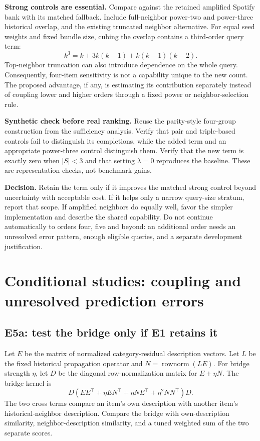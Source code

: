 \documentclass[11pt,a4paper]{article}
\newcommand{\rownorm}{\operatorname{rownorm}}
\begin{document}
\textbf{Strong controls are essential.} Compare against the retained
amplified Spotify bank with its matched fallback. Include full-neighbor
power-two and power-three historical overlap, and the existing truncated
neighbor alternative. For equal seed weights and fixed bundle size, cubing
the overlap contains a third-order query term:
\begin{equation}
 k^3=k+3k(k-1)+k(k-1)(k-2).
\end{equation}
Top-neighbor truncation can also introduce dependence on the whole query.
Consequently, four-item sensitivity is not a capability unique to the new
count. The proposed advantage, if any, is estimating its contribution
separately instead of coupling lower and higher orders through a fixed power
or neighbor-selection rule.

\textbf{Synthetic check before real ranking.} Reuse the parity-style
four-group construction from the sufficiency analysis. Verify that pair and
triple-based controls fail to distinguish its completions, while the added
term and an appropriate power-three control distinguish them. Verify that
the new term is exactly zero when $|S|<3$ and that setting $\lambda=0$
reproduces the baseline. These are representation checks, not benchmark gains.

\textbf{Decision.} Retain the term only if it improves the matched strong
control beyond uncertainty with acceptable cost. If it helps only a narrow
query-size stratum, report that scope. If amplified neighbors do equally
well, favor the simpler implementation and describe the shared capability.
Do not continue automatically to orders four, five and beyond: an additional
order needs an unresolved error pattern, enough eligible queries, and a
separate development justification.

\section{Conditional studies: coupling and unresolved prediction errors}
\label{sec:e5}

\subsection{E5a: test the bridge only if E1 retains it}

Let $E$ be the matrix of normalized category-residual description vectors.
Let $L$ be the fixed historical propagation operator and
$N=\rownorm(LE)$. For bridge strength $\eta$, let $D$ be the diagonal
row-normalization matrix for $E+\eta N$. The bridge kernel is
\begin{equation}
 D(EE^\top+\eta EN^\top+\eta NE^\top+\eta^2NN^\top)D.
\end{equation}
The two cross terms compare an item's own description with another item's
historical-neighbor description. Compare the bridge with own-description
similarity, neighbor-description similarity, and a tuned weighted sum of the
two separate scores.
\end{document}
